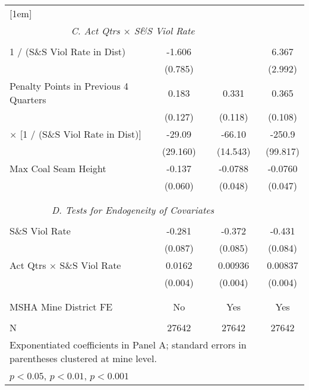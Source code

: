 {\begin{tabular}{l*{3}{c}}
[1em]
\hline \\ \multicolumn{3}{c}{\textit{C. Act Qtrs $\times$ S\&S Viol Rate}} \\&                     &                     &                     \\
1 / (S\&S Viol Rate in Dist)&      -1.606\sym{*}  &                     &       6.367\sym{*}  \\
                         &     (0.785)         &                     &     (2.992)         \\
[1em]
Penalty Points in Previous 4 Quarters&       0.183         &       0.331\sym{**} &       0.365\sym{***}\\
                         &     (0.127)         &     (0.118)         &     (0.108)         \\
[1em]
[1 / (Mean Act Qtrs in Dist)] $\times$ [1 / (S\&S Viol Rate in Dist)]&      -29.09         &      -66.10\sym{***}&      -250.9\sym{*}  \\
                         &    (29.160)         &    (14.543)         &    (99.817)         \\
[1em]
Max Coal Seam Height     &      -0.137\sym{*}  &     -0.0788         &     -0.0760         \\
                         &     (0.060)         &     (0.048)         &     (0.047)         \\
[1em]
                         &                     &                     &                     \\
\hline \\ \multicolumn{3}{c}{\textit{D. Tests for Endogeneity of Covariates}} \\
                         &                     &                     &                     \\
S\&S Viol Rate           &      -0.281\sym{**} &      -0.372\sym{***}&      -0.431\sym{***}\\
                         &     (0.087)         &     (0.085)         &     (0.084)         \\
[1em]
Act Qtrs $\times$ S\&S Viol Rate&      0.0162\sym{***}&     0.00936\sym{*}  &     0.00837\sym{*}  \\
                         &     (0.004)         &     (0.004)         &     (0.004)         \\
[1em]
                         &                     &                     &                     \\
\hline \\
MSHA Mine District FE    &          No         &         Yes         &         Yes         \\
\\ \hline
N                        &       27642         &       27642         &       27642         \\
\hline\hline \multicolumn{3}{l}{\footnotesize Exponentiated coefficients in Panel A; standard errors in parentheses clustered at mine level.}\\\multicolumn{3}{l}{\footnotesize \sym{*} \(p<0.05\), \sym{**} \(p<0.01\), \sym{***} \(p<0.001\)}\\ \end{tabular} }
